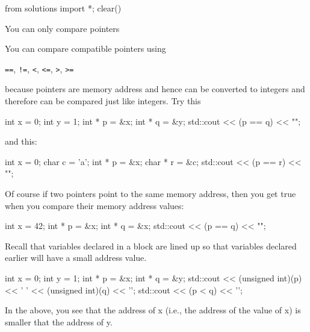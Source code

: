 \begin{python0}
from solutions import *; clear()
\end{python0}

You can only compare pointers 

You can compare compatible pointers using
\begin{center}
\texttt{==}, \texttt{!=}, \texttt{<}, \texttt{<=}, \texttt{>}, \texttt{>=}
\end{center}
because pointers are memory address and hence can be converted to integers and therefore can be compared just like integers. Try this

\begin{consolethree}[escapeinside=||]
int x = 0;
int y = 1;
int * p = &x;
int * q = &y;
std::cout << (p == q) << "\n";
\end{consolethree}

and this:

\begin{consolethree}[escapeinside=||]
int x = 0;
char c = 'a';
int * p = &x;
char * r = &c;
std::cout << (p == r) << "\n";
\end{consolethree}

Of course if two pointers point to the same memory address, then you get
true when you compare their memory address values:

\begin{consolethree}[escapeinside=||]
int x = 42;
int * p = &x;
int * q = &x;
std::cout << (p == q) << "\n";
\end{consolethree}

Recall that variables declared in a block are lined up so that variables declared earlier will have a small address value.

\begin{consolethree}[escapeinside=||]
int x = 0;
int y = 1;
int * p = &x;
int * q = &y;
std::cout << (unsigned int)(p) << ' '
          << (unsigned int)(q) << '\n';
std::cout << (p < q) << '\n';
\end{consolethree}
In the above, you see that the address of x (i.e., the address of the value of x) is smaller that the address of y.






